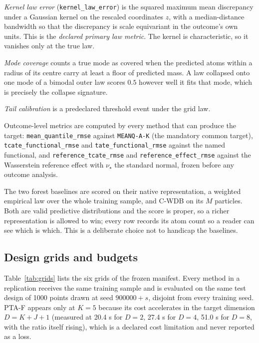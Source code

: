 \documentclass[11pt,a4paper]{article}
\theoremstyle{definition}
\theoremstyle{remark}
\newcommand{\CWDB}{\textsf{C-WDB}}
\begin{document}
\emph{Kernel law error} (\texttt{kernel\_law\_error}) is the squared maximum mean
discrepancy under a Gaussian kernel on the rescaled coordinates $z$, with a
median-distance bandwidth so that the discrepancy is scale equivariant in the
outcome's own units. This is the \emph{declared primary law metric}. The kernel
is characteristic, so it vanishes only at the true law.

\emph{Mode coverage} counts a true mode as covered when the predicted atoms
within a radius of its centre carry at least a floor of predicted mass. A law
collapsed onto one mode of a bimodal outer law scores $0.5$ however well it fits
that mode, which is precisely the collapse signature.

\emph{Tail calibration} is a predeclared threshold event under the grid law.

Outcome-level metrics are computed by every method that can produce the target:
\texttt{mean\_quantile\_rmse} against \texttt{MEANQ-A-K} (the mandatory common
target), \texttt{tcate\_functional\_rmse} and \texttt{tate\_functional\_rmse}
against the named functional, and \texttt{reference\_tcate\_rmse} and
\texttt{reference\_effect\_rmse} against the Wasserstein reference effect with
$\nu_\star$ the standard normal, frozen before any outcome analysis.

The two forest baselines are scored on their native representation, a weighted
empirical law over the whole training sample, and \CWDB{} on its $M$ particles.
Both are valid predictive distributions and the score is proper, so a richer
representation is allowed to win; every row records its atom count so a reader
can see which is which. This is a deliberate choice not to handicap the
baselines.

\subsection{Design grids and budgets}

Table~\ref{tab:grids} lists the six grids of the frozen manifest. Every method in
a replication receives the same training sample and is evaluated on the same test
design of 1000 points drawn at seed $900000 + s$, disjoint from every training
seed. PTA-F appears only at $K = 5$ because its cost accelerates in the target
dimension $D = K + J + 1$ (measured at 20.4 s for $D=2$, 27.4 s for $D=4$, 51.0 s
for $D=8$, with the ratio itself rising), which is a declared cost limitation and
never reported as a loss.
\end{document}
